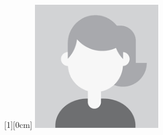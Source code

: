 \newpage

\begin{flushright}
	\raisebox{-5,1cm}[1][0cm]
	{\includegraphics[width=5.5cm]{image/pic.png}}
\end{flushright}


